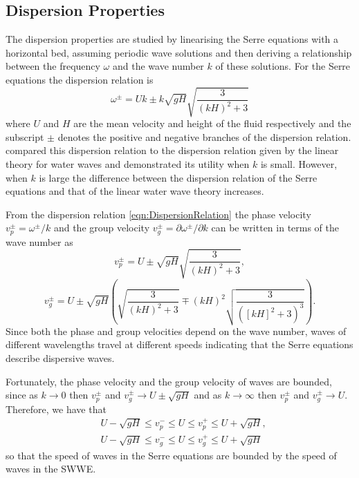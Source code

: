 \subsection{Dispersion Properties}
The dispersion properties are studied by linearising the Serre equations with a horizontal bed, assuming periodic wave solutions and then deriving a relationship between the frequency $\omega$ and the wave number $k$ of these solutions. For the Serre equations the dispersion relation \cite{Li-2014-169} is
\begin{equation}
\label{eqn:DispersionRelation}
\omega^\pm = Uk \pm k \sqrt{gH} \sqrt{\frac{3}{\left(kH\right)^2 + 3}}
\end{equation}
where $U$ and $H$ are the mean velocity and height of the fluid respectively and the subscript $\pm$ denotes the positive and negative branches of the dispersion relation. \citet{Barthelemy-2004-315} compared this dispersion relation to the dispersion relation given by the linear theory for water waves and demonstrated its utility when $k$ is small. However, when $k$ is large the difference between the dispersion relation of the Serre equations and that of the linear water wave theory increases. 


From the dispersion relation \eqref{eqn:DispersionRelation} the phase velocity $v_p^\pm = \omega^\pm / k$ and the group velocity $v_g^\pm = \partial \omega^\pm / \partial  k$ can be written in terms of the wave number as
	\begin{equation*}
	\label{eqn:WaveVelocitiesPhase}
	v_p^\pm = U \pm \sqrt{gH}\sqrt{\frac{3}{\left(kH\right)^2 + 3}},
	\end{equation*}
	\begin{equation*}
	\label{eqn:WaveVelocitiesGroup}
	v_g^\pm = U \pm \sqrt{gH} \left(\sqrt{\frac{3}{\left(kH\right)^2 + 3}} \mp \left(kH\right)^2 \sqrt{\frac{3}{\left(\left[kH\right]^2 + 3 \right)^3}}\right).
	\end{equation*}
Since both the phase and group velocities depend on the wave number, waves of different wavelengths travel at different speeds indicating that the Serre equations describe dispersive waves.

Fortunately, the phase velocity and the group velocity of waves are bounded, since as $k \rightarrow 0$ then $v_p^\pm$ and $v_g^\pm \rightarrow U \pm \sqrt{gH}$ and as $k \rightarrow \infty$ then $v_p^\pm$ and $v_g^\pm \rightarrow U$. Therefore, we have that
\begin{subequations}
\begin{align}
&U - \sqrt{gH} \le v_p^- \le U \le v_p^+ \le U + \sqrt{gH}, \\
&U - \sqrt{gH} \le v_g^- \le U \le v_g^+ \le U + \sqrt{gH}
\end{align}
\label{eqn:WaveVelocitiesBound}
\end{subequations}
so that the speed of waves in the Serre equations are bounded by the speed of waves in the SWWE.

